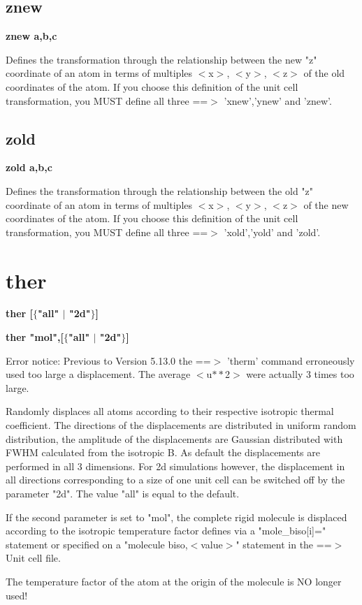 \subsection*{znew}
{\bf znew a,b,c \par }
\par
\vspace{3pt}
Defines the transformation through the relationship between the new 
"z" coordinate of an atom in terms of multiples $ <$x$> $, $ <$y$> $, $ <$z$> $ of 
the old coordinates of the atom. 
If you choose this definition of the unit cell transformation, you MUST 
define all three ==$> $ 'xnew','ynew' and 'znew'. 
\subsection*{zold}
{\bf zold a,b,c \par }
\par
\vspace{3pt}
Defines the transformation through the relationship between the old 
"z" coordinate of an atom in terms of multiples $ <$x$> $, $ <$y$> $, $ <$z$> $ of 
the new coordinates of the atom. 
If you choose this definition of the unit cell transformation, you MUST 
define all three ==$> $ 'xold','yold' and 'zold'. 
\section{ther}
{\bf ther [$ \{$"all" $| $ "2d"$\} $] \par }
{\bf ther "mol",[$ \{$"all" $| $ "2d"$\} $] \par }
\vspace{3pt}
Error notice: 
Previous to Version 5.13.0 
the ==$> $ 'therm' command erroneously used too large a displacement. 
The average $ <$u$**$2$> $ were actually 3 times too large. 
\par
Randomly displaces all atoms according to their respective isotropic 
thermal coefficient. The directions of the displacements are distributed 
in uniform random distribution, the amplitude of the displacements 
are Gaussian distributed with FWHM calculated from the isotropic B. 
As default the displacements are performed in all 3 dimensions. For 
2d simulations however, the displacement in all directions corresponding 
to a size of one unit cell can be switched off by the parameter "2d". 
The value "all" is equal to the default. 
\par
If the second parameter is set to "mol", the complete rigid molecule 
is displaced according to the isotropic temperature factor 
defines via a "mole\_biso[i]=" statement or specified on a 
"molecule biso,$ <$value$> $" statement in the ==$> $ Unit cell file. 
\par
The temperature factor of the atom at the origin of the molecule 
is NO longer used! 
